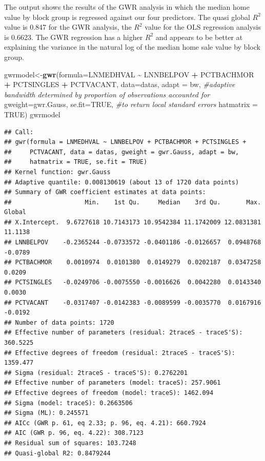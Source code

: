 \documentclass[
]{article}
\newenvironment{Shaded}{\begin{snugshade}}{\end{snugshade}}
\newcommand{\AttributeTok}[1]{\textcolor[rgb]{0.13,0.29,0.53}{#1}}
\newcommand{\CommentTok}[1]{\textcolor[rgb]{0.56,0.35,0.01}{\textit{#1}}}
\newcommand{\ConstantTok}[1]{\textcolor[rgb]{0.56,0.35,0.01}{#1}}
\newcommand{\FunctionTok}[1]{\textcolor[rgb]{0.13,0.29,0.53}{\textbf{#1}}}
\newcommand{\NormalTok}[1]{#1}
\newcommand{\OtherTok}[1]{\textcolor[rgb]{0.56,0.35,0.01}{#1}}
\newcommand{\SpecialCharTok}[1]{\textcolor[rgb]{0.81,0.36,0.00}{\textbf{#1}}}
\begin{document}
The output shows the results of the GWR analysis in which the median
home value by block group is regressed against our four predictors. The
quasi global \(R^2\) value is 0.847 for the GWR analysis, the \(R^2\)
value for the OLS regression analysis is 0.6623. The GWR regression has
a higher \(R^2\) and appears to be better at explaining the variance in
the natural log of the median home sale value by block group.

\begin{Shaded}
\begin{Highlighting}[]
\NormalTok{gwrmodel}\OtherTok{\textless{}{-}}\FunctionTok{gwr}\NormalTok{(}\AttributeTok{formula=}\NormalTok{LNMEDHVAL }\SpecialCharTok{\textasciitilde{}}\NormalTok{ LNNBELPOV }\SpecialCharTok{+}\NormalTok{ PCTBACHMOR }\SpecialCharTok{+}\NormalTok{ PCTSINGLES }\SpecialCharTok{+}\NormalTok{ PCTVACANT,}
            \AttributeTok{data=}\NormalTok{datas,}
            \AttributeTok{adapt =}\NormalTok{ bw, }\CommentTok{\#adaptive bandwidth determined by proportion of observations accounted for}
            \AttributeTok{gweight=}\NormalTok{gwr.Gauss,}
            \AttributeTok{se.fit=}\ConstantTok{TRUE}\NormalTok{, }\CommentTok{\#to return local standard errors}
            \AttributeTok{hatmatrix =} \ConstantTok{TRUE}\NormalTok{)}
\NormalTok{gwrmodel}
\end{Highlighting}
\end{Shaded}

\begin{verbatim}
## Call:
## gwr(formula = LNMEDHVAL ~ LNNBELPOV + PCTBACHMOR + PCTSINGLES + 
##     PCTVACANT, data = datas, gweight = gwr.Gauss, adapt = bw, 
##     hatmatrix = TRUE, se.fit = TRUE)
## Kernel function: gwr.Gauss 
## Adaptive quantile: 0.008130619 (about 13 of 1720 data points)
## Summary of GWR coefficient estimates at data points:
##                    Min.    1st Qu.     Median    3rd Qu.       Max.  Global
## X.Intercept.  9.6727618 10.7143173 10.9542384 11.1742009 12.0831381 11.1138
## LNNBELPOV    -0.2365244 -0.0733572 -0.0401186 -0.0126657  0.0948768 -0.0789
## PCTBACHMOR    0.0010974  0.0101380  0.0149279  0.0202187  0.0347258  0.0209
## PCTSINGLES   -0.0249706 -0.0075550 -0.0016626  0.0042280  0.0143340  0.0030
## PCTVACANT    -0.0317407 -0.0142383 -0.0089599 -0.0035770  0.0167916 -0.0192
## Number of data points: 1720 
## Effective number of parameters (residual: 2traceS - traceS'S): 360.5225 
## Effective degrees of freedom (residual: 2traceS - traceS'S): 1359.477 
## Sigma (residual: 2traceS - traceS'S): 0.2762201 
## Effective number of parameters (model: traceS): 257.9061 
## Effective degrees of freedom (model: traceS): 1462.094 
## Sigma (model: traceS): 0.2663506 
## Sigma (ML): 0.245571 
## AICc (GWR p. 61, eq 2.33; p. 96, eq. 4.21): 660.7924 
## AIC (GWR p. 96, eq. 4.22): 308.7123 
## Residual sum of squares: 103.7248 
## Quasi-global R2: 0.8479244
\end{verbatim}
\end{document}
